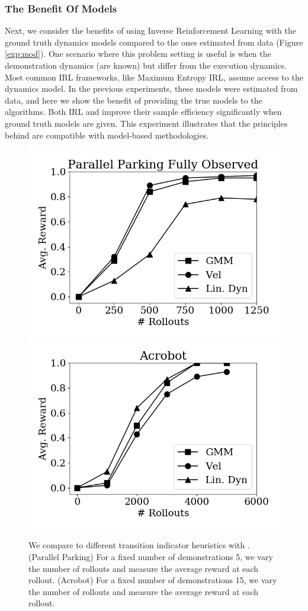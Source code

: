 \subsubsection{The Benefit Of Models}
Next, we consider the benefits of using Inverse Reinforcement Learning with the ground truth dynamics models compared to the ones estimated from data (Figure \ref{exp:mod}). One scenario where this problem setting is useful is when the demonstration dynamics (are known) but differ from the execution dynamics. Most common IRL frameworks, like Maximum Entropy IRL, assume access to the dynamics model. In the previous experiments, these models were estimated from data, and here we show the benefit of providing the true models to the algorithms. Both IRL and \hirl improve their sample efficiency significantly when ground truth models are given. This experiment illustrates that the principles behind \hirl are compatible with model-based methodologies.

\begin{figure}[t]
\centering
 \includegraphics[width=0.48\columnwidth]{swirl-experiments/ppfo-seg1.png}
 \includegraphics[width=0.48\columnwidth]{swirl-experiments/ppfo-seg2.png}
 \caption{We compare to different transition indicator heuristics with \hirl.  (Parallel Parking) For a fixed number of demonstrations 5, we vary the number of rollouts and measure the average reward at each rollout.  (Acrobot) For a fixed number of demonstrations 15, we vary the number of rollouts and measure the average reward at each rollout. \label{exp:seg}}
\end{figure}

